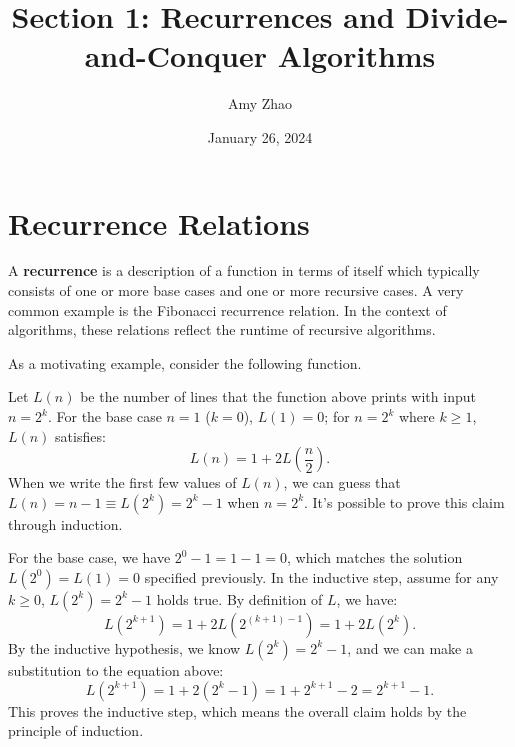 \documentclass[11pt]{article}
\title{Section 1: Recurrences and Divide-and-Conquer Algorithms}
\date{January 26, 2024}
\author{Amy Zhao}
\begin{document}
\renewcommand\labelitemi{$\vcenter{\hbox{\tiny$\bullet$}}$}
\renewcommand\labelitemii{$\vcenter{\hbox{\tiny$\bullet$}}$}

\maketitle

\section{Recurrence Relations}
A \textbf{recurrence} is a description of a function in terms of itself which typically consists of one or more base cases and one or more recursive cases. A very common example is the Fibonacci recurrence relation. In the context of algorithms, these relations reflect the runtime of recursive algorithms. 

As a motivating example, consider the following function.

\IncMargin{2em}
\begin{algorithm}[H]
    \footnotesize
    \DontPrintSemicolon
\end{algorithm}\DecMargin{2em} 

Let $L(n)$ be the number of lines that the function above prints with input $n = 2^k$. For the base case $n = 1$ ($k = 0$), $L(1) = 0$; for $n = 2^k$ where $k \geq 1$, $L(n)$ satisfies:
\begin{equation}
    L(n) = 1 + 2L \left(\frac{n}{2}\right).
\end{equation}
When we write the first few values of $L(n)$, we can guess that $L(n) = n - 1 \equiv L(2^k) = 2^k - 1$ when $n = 2^k$. It's possible to prove this claim through induction. 

For the base case, we have $2^0 - 1 = 1 - 1 = 0$, which matches the solution $L(2^0) = L(1) = 0$ specified previously. In the inductive step, assume for any $k \geq 0$, $L(2^k) = 2^k - 1$ holds true. By definition of $L$, we have:
\begin{equation*}
    L(2^{k+1}) = 1 + 2L (2^{(k+1) - 1}) = 1 + 2L(2^k).
\end{equation*}
By the inductive hypothesis, we know $L(2^k) = 2^k - 1$, and we can make a substitution to the equation above:
\begin{equation*}
    L(2^{k+1}) = 1 + 2(2^k - 1)  = 1 + 2^{k+1} - 2 = 2^{k+1} - 1.
\end{equation*}
This proves the inductive step, which means the overall claim holds by the principle of induction. 
\end{document}

